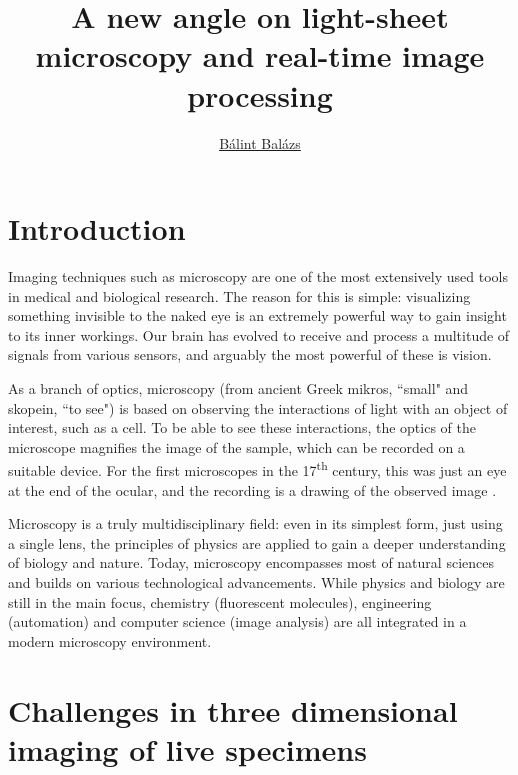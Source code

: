 \documentclass{booklet_style}
\author{\href{mailto:balint.balazs@embl.de}{Bálint Balázs}}
\title{A new angle on light-sheet microscopy and real-time image processing}
\begin{document}
\graphicspath{{./figures/}}
\maketitle

\clearpage{\thispagestyle{empty}\cleardoublepage}


\setcounter{page}{1}
\section{Introduction}

Imaging techniques such as microscopy are one of the most extensively used tools in medical and biological research. The reason for this is simple: visualizing something invisible to the naked eye is an extremely powerful way to gain insight to its inner workings. Our brain has evolved to receive and process a multitude of signals from various sensors, and arguably the most powerful of these is vision.

As a branch of optics, microscopy (from ancient Greek mikros, ``small" and skopein, ``to see") is based on observing the interactions of light with an object of interest, such as a cell. To be able to see these interactions, the optics of the microscope magnifies the image of the sample, which can be recorded on a suitable device. For the first microscopes in the 17\textsuperscript{th} century, this was just an eye at the end of the ocular, and the recording is a drawing of the observed image \cite{hooke_micrographia:_1665}.

Microscopy is a truly multidisciplinary field: even in its simplest form, just using a single lens, the principles of physics are applied to gain a deeper understanding of biology and nature. Today, microscopy encompasses most of natural sciences and builds on various technological advancements. While physics and biology are still in the main focus, chemistry (fluorescent molecules), engineering (automation) and computer science (image analysis) are all integrated in a modern microscopy environment.


\section{Challenges in three dimensional imaging of live specimens}
\end{document}

